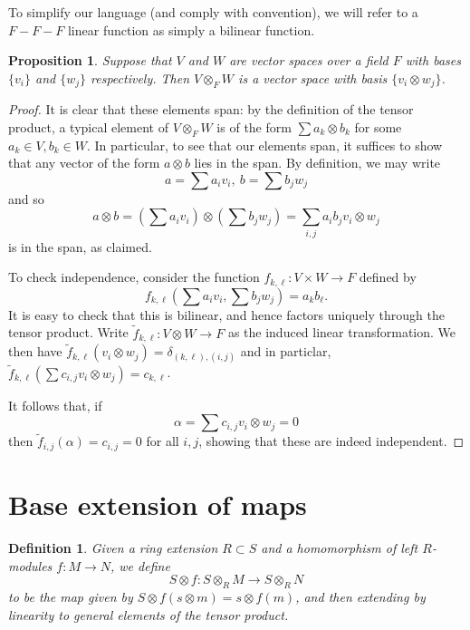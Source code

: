 \documentclass[12pt]{report}
\theoremstyle{plain}
\newtheorem{defn}[thm]{Definition}
\newtheorem{prop}[thm]{Proposition}
\newcommand{\til}{\widetilde}
\begin{document}
To simplify our language (and comply with convention), we will refer to a
$F-F-F$ linear function as simply a bilinear function.

\begin{prop} \label{tensor basis}
Suppose that $V$ and $W$ are vector spaces over a field $F$ with bases
$\{v_i\}$ and $\{w_j\}$ respectively. Then $V \otimes_F W$ is a vector
space with basis $\{v_i \otimes w_j\}$.
\end{prop}
\begin{proof}
It is clear that these elements span: by the definition of the tensor
product, a typical element of $V \otimes_F W$ is of the form $\sum a_k
\otimes b_k$ for some $a_k \in V, b_k \in W$. In particular, to see that
our elements span, it suffices to show that any vector of the form $a
\otimes b$ lies in the span. By definition, we may write
\[ a = \sum a_i v_i, \ b = \sum b_j w_j \]
and so
\[ a \otimes b = (\sum a_i v_i) \otimes (\sum b_j w_j) = \sum_{i,j} a_i b_j
v_i \otimes w_j \]
is in the span, as claimed.

To check independence, consider the function $f_{k,\ell} : V \times W \to F$
defined by
\[ f_{k, \ell} (\sum a_i v_i, \sum b_j w_j) = a_k b_\ell.\]
It is easy to check that this is bilinear, and hence factors uniquely
through the tensor product. Write $\til f_{k, \ell} : V \otimes W \to F$ as
the induced linear transformation. We then have 
$\til f_{k, \ell} (v_i \otimes w_j) = \delta_{(k, \ell), (i, j)}$ 
and in particlar, 
$\til f_{k, \ell}(\sum c_{i,j} v_i \otimes w_j) = c_{k, \ell}$.

It follows that, if 
\[\alpha = \sum c_{i, j} v_i \otimes w_j = 0\]
then $\til f_{i, j}(\alpha) = c_{i, j} = 0$ for all $i, j$, showing that
these are indeed independent.
\end{proof}

\section{Base extension of maps}

\begin{defn}
Given a ring extension $R \subset S$ and a homomorphism of left $R$-modules
$f : M \to N$, we define 
\[S \otimes f : S \otimes_R M \to S \otimes_R N\]
to be the map given by $S \otimes f (s \otimes m) = s \otimes f(m)$, and
then extending by linearity to general elements of the tensor product.
\end{defn}
\end{document}

